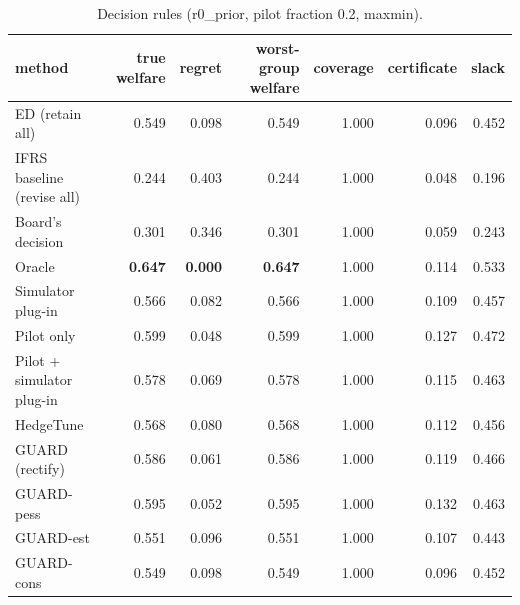 \begin{table}[t]
\centering
\small
\begin{tabular}{lrrrrrr}
\toprule
method & true welfare & regret & worst-group welfare & coverage & certificate & slack \\
\midrule
ED (retain all) & 0.549 & 0.098 & 0.549 & 1.000 & 0.096 & 0.452 \\
IFRS baseline (revise all) & 0.244 & 0.403 & 0.244 & 1.000 & 0.048 & 0.196 \\
Board's decision & 0.301 & 0.346 & 0.301 & 1.000 & 0.059 & 0.243 \\
Oracle & \textbf{0.647} & \textbf{0.000} & \textbf{0.647} & 1.000 & 0.114 & 0.533 \\
Simulator plug-in & 0.566 & 0.082 & 0.566 & 1.000 & 0.109 & 0.457 \\
Pilot only & 0.599 & 0.048 & 0.599 & 1.000 & 0.127 & 0.472 \\
Pilot + simulator plug-in & 0.578 & 0.069 & 0.578 & 1.000 & 0.115 & 0.463 \\
HedgeTune & 0.568 & 0.080 & 0.568 & 1.000 & 0.112 & 0.456 \\
GUARD (rectify) & 0.586 & 0.061 & 0.586 & 1.000 & 0.119 & 0.466 \\
GUARD-pess & 0.595 & 0.052 & 0.595 & 1.000 & 0.132 & 0.463 \\
GUARD-est & 0.551 & 0.096 & 0.551 & 1.000 & 0.107 & 0.443 \\
GUARD-cons & 0.549 & 0.098 & 0.549 & 1.000 & 0.096 & 0.452 \\
\bottomrule
\end{tabular}
\caption{Decision rules (r0\_prior, pilot fraction 0.2, maxmin).}
\label{tab:methods-maxmin}
\end{table}
